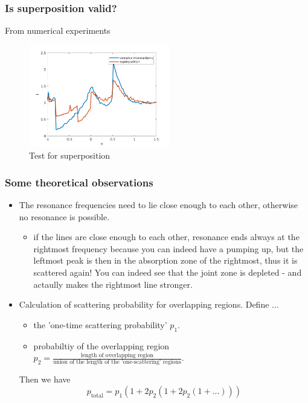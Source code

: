 \documentclass[../main/main.tex]{subfiles}
\begin{document}
\newpage
\subsubsection{Is superposition valid?}
From numerical experiments

\begin{figure}[!htp]
\centering
\includegraphics[width=0.55\textwidth]{../../two_resonance_lines/figures/superposition_test.png}
\caption{Test for superposition}
\label{test_superposition_1}
\end{figure}

\noindent{}

\subsubsection{Some theoretical observations}
\begin{itemize}
\item The resonance frequencies need to lie close enough to each other, otherwise no resonance is possible.

\begin{itemize}
\item if the lines are close enough to each other, resonance ends always at the rightmost frequency because you can indeed have a pumping up, but the leftmost peak is then in the absorption zone of the rightmost, thus it is scattered again! You can indeed see that the joint zone is depleted - and actaully makes the rightmost line stronger.
\end{itemize}


\item Calculation of scattering probability for overlapping regions. Define ...
\begin{itemize}
\item the 'one-time scattering probability' $p_1$.
\item probabiltiy of the overlapping region $p_2 = \frac{\text{length of overlapping region}}{\text{union of the length of the 'one-scattering' regions}}$. 
\end{itemize}
Then we have
\begin{equation}
p_{\text{total}} = p_1(1+2p_2(1+2p_2(1+...)))
\end{equation}

\end{itemize}
\end{document}
